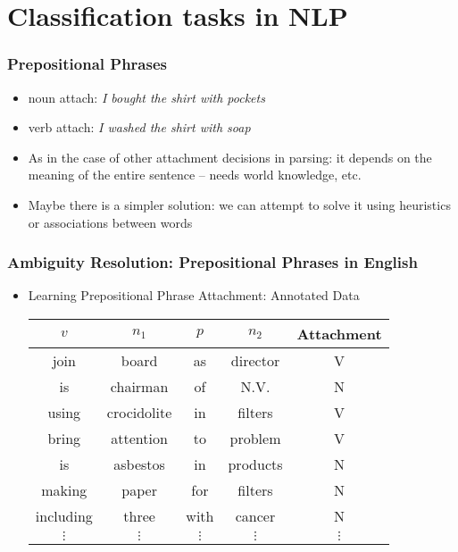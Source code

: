 




\section{Classification tasks in NLP}
\frame{\tableofcontents[currentsection]}

\begin{frame}
\frametitle{Prepositional Phrases}
\begin{itemize}[<+->]
\item noun attach: {\em I bought the shirt with pockets}
\item verb attach: {\em I washed the shirt with soap}
\item As in the case of other attachment decisions in parsing: it depends on the meaning of the entire sentence -- needs world knowledge, etc.
\item Maybe there is a simpler solution: we can attempt to solve it using heuristics or associations between words
\end{itemize}

\end{frame}

\begin{frame}
\frametitle{Ambiguity Resolution: Prepositional Phrases in English}
  \begin{itemize}[<+->]
  \item Learning Prepositional Phrase Attachment: Annotated Data
\begin{tabular}{|cccc|c|}
\hline
$v$    &     $n_1$   &      $p$ & $n_2$ &       Attachment\\
\hline
join   &   board    &   as &  director & V \\
is       & chairman  &  of  & N.V.    & N \\
using  &   crocidolite & in  & filters & V \\
bring  &   attention  & to  & problem &  V \\ 
is      &  asbestos   & in &  products & N \\
making &   paper    &   for & filters & N \\
including & three     &  with & cancer &  N \\
$\vdots$ & $\vdots$ & $\vdots$ & $\vdots$ & $\vdots$ \\
\hline
\end{tabular}
  \end{itemize}

\end{frame}

